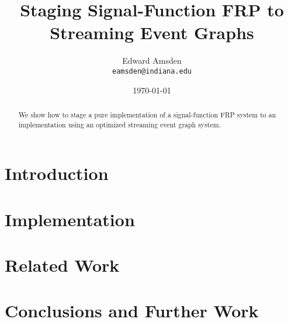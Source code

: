 \documentclass{article}
\title{Staging Signal-Function FRP to Streaming Event Graphs}
\author{Edward Amsden\\{\tt eamsden@indiana.edu}}
\date{\today}
\begin{document}
\maketitle

\begin{abstract}

We show how to stage a pure implementation of a signal-function FRP system to an
implementation using an optimized streaming event graph system.

\end{abstract}

\section{Introduction}
\label{section:Introduction}

\section{Implementation}
\label{section:Implementation}

\section{Related Work}
\label{section:Related_Work}

\section{Conclusions and Further Work}
\label{section:Conclusions_and_Further_Work}
\end{document}
